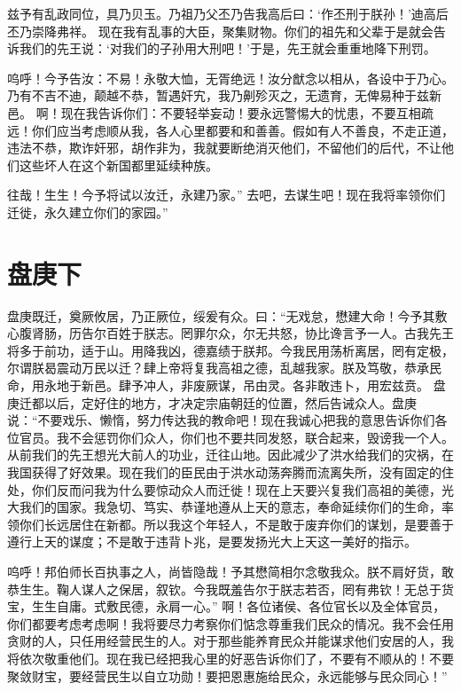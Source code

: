 \documentclass[12pt,UTF8]{ctexbook}
\begin{document}
兹予有乱政同位，具乃贝玉。乃祖乃父丕乃告我高后曰：‘作丕刑于朕孙！’迪高后丕乃崇降弗祥。
现在我有乱事的大臣，聚集财物。你们的祖先和父辈于是就会告诉我们的先王说：‘对我们的子孙用大刑吧！’于是，先王就会重重地降下刑罚。

呜呼！今予告汝：不易！永敬大恤，无胥绝远！汝分猷念以相从，各设中于乃心。乃有不吉不迪，颠越不恭，暂遇奸宄，我乃劓殄灭之，无遗育，无俾易种于兹新邑。
啊！现在我告诉你们：不要轻举妄动！要永远警惕大的忧患，不要互相疏远！你们应当考虑顺从我，各人心里都要和和善善。假如有人不善良，不走正道，违法不恭，欺诈奸邪，胡作非为，我就要断绝消灭他们，不留他们的后代，不让他们这些坏人在这个新国都里延续种族。

往哉！生生！今予将试以汝迁，永建乃家。”
去吧，去谋生吧！现在我将率领你们迁徙，永久建立你们的家园。”

\chapter{盘庚下}

盘庚既迁，奠厥攸居，乃正厥位，绥爰有众。曰：“无戏怠，懋建大命！今予其敷心腹肾肠，历告尔百姓于朕志。罔罪尔众，尔无共怒，协比谗言予一人。古我先王将多于前功，适于山。用降我凶，德嘉绩于朕邦。今我民用荡析离居，罔有定极，尔谓朕曷震动万民以迁？肆上帝将复我高祖之德，乱越我家。朕及笃敬，恭承民命，用永地于新邑。肆予冲人，非废厥谋，吊由灵。各非敢违卜，用宏兹贲。
盘庚迁都以后，定好住的地方，才决定宗庙朝廷的位置，然后告诫众人。盘庚说：“不要戏乐、懒惰，努力传达我的教命吧！现在我诚心把我的意思告诉你们各位官员。我不会惩罚你们众人，你们也不要共同发怒，联合起来，毁谤我一个人。从前我们的先王想光大前人的功业，迁往山地。因此减少了洪水给我们的灾祸，在我国获得了好效果。现在我们的臣民由于洪水动荡奔腾而流离失所，没有固定的住处，你们反而问我为什么要惊动众人而迁徙！现在上天要兴复我们高祖的美德，光大我们的国家。我急切、笃实、恭谨地遵从上天的意志，奉命延续你们的生命，率领你们长远居住在新都。所以我这个年轻人，不是敢于废弃你们的谋划，是要善于遵行上天的谋度；不是敢于违背卜兆，是要发扬光大上天这一美好的指示。

呜呼！邦伯师长百执事之人，尚皆隐哉！予其懋简相尔念敬我众。朕不肩好货，敢恭生生。鞠人谋人之保居，叙钦。今我既羞告尔于朕志若否，罔有弗钦！无总于货宝，生生自庸。式敷民德，永肩一心。”
啊！各位诸侯、各位官长以及全体官员，你们都要考虑考虑啊！我将要尽力考察你们惦念尊重我们民众的情况。我不会任用贪财的人，只任用经营民生的人。对于那些能养育民众并能谋求他们安居的人，我将依次敬重他们。现在我已经把我心里的好恶告诉你们了，不要有不顺从的！不要聚敛财宝，要经营民生以自立功勋！要把恩惠施给民众，永远能够与民众同心！”
\end{document}
